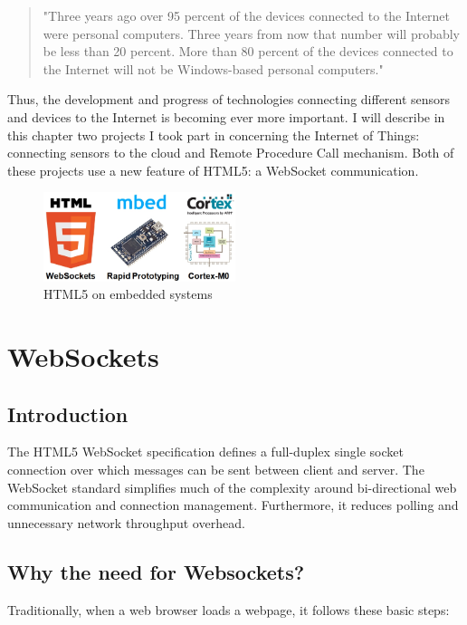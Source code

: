 \documentclass[pdftex,10pt,a4paper]{report}
\begin{document}
\begin{quote} "Three years ago over 95 percent of the devices connected to the Internet were personal computers. Three years from now that number will probably be less than 20 percent. More than 80 percent of the devices connected to the Internet will not be Windows-based personal computers." \\
\end{quote}

Thus, the development and progress of technologies connecting different sensors and devices to the Internet is becoming ever more important. I will describe in this chapter two projects I took part in concerning the Internet of Things: connecting sensors to the cloud and Remote Procedure Call mechanism. Both of these projects use a new feature of HTML5: a WebSocket communication.


\begin{figure}[h!]
		\centering
		\includegraphics[width=0.5\textwidth]{./logo_ws.jpg}
		\caption{HTML5 on embedded systems}
		\label{HTML5 on embedded systems}
\end{figure}

\section{WebSockets}
\subsection{Introduction}
The HTML5 WebSocket specification defines a full-duplex single socket connection over which messages can be sent between client and server. The WebSocket standard simplifies much of the complexity around bi-directional web communication and connection management. Furthermore, it reduces polling and unnecessary network throughput overhead.

\subsection{Why the need for Websockets?}
Traditionally, when a web browser loads a webpage, it follows these basic steps:
\end{document}
